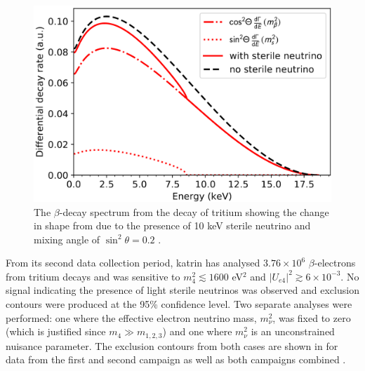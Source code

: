 \begin{figure}[h!]
    \centering
    \includegraphics[width = \largefigwidth]{figures-chap2/KATRIN_kink.png}
    \caption[$\beta$-decay spectrum from tritium decay with the inclusion of the presence of a sterile neutrino.]{The $\beta$-decay spectrum from the decay of tritium showing the change in shape from due to the presence of 10 keV sterile neutrino and mixing angle of $\sin^2{\theta} = 0.2$ \cite{A_novel_detector_system_for_KATRIN_to_search_for_keV_scale_sterile_neutrinos}.}
    \label{fig:katrin_kink_beta_decay}
\end{figure}

From its second data collection period, \gls{katrin} has analysed $3.76 \times 10^6$ $\beta$-electrons from tritium decays and was sensitive to $m_4^2 \lesssim 1600$ eV$^2$ and $|U_{e4}|^2 \gtrsim 6 \times 10^{-3}$. No signal indicating the presence of light sterile neutrinos was observed and exclusion contours were produced at the 95\% confidence level. Two separate analyses were performed: one where the effective electron neutrino mass, $m_{\nu}^2$, was fixed to zero (which is justified since $m_4 \gg m_{1,2,3}$) and one where $m_{\nu}^2$ is an unconstrained nuisance parameter. The exclusion contours from both cases are shown in  for data from the first and second campaign as well as both campaigns combined \cite{KATRIN_sterile_neutrino_results}. 

